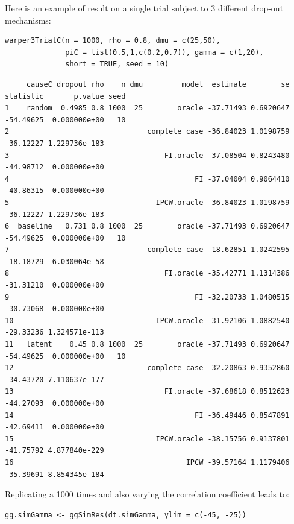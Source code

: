 \documentclass[12pt]{article}
\begin{document}
Here is an example of result on a single trial subject to 3 different
drop-out mechanisms:
\lstset{language=r,label= ,caption= ,captionpos=b,numbers=none}
\begin{lstlisting}
warper3TrialC(n = 1000, rho = 0.8, dmu = c(25,50),
              piC = list(0.5,1,c(0.2,0.7)), gamma = c(1,20),
              short = TRUE, seed = 10)
\end{lstlisting}

\begin{verbatim}
     causeC dropout rho    n dmu         model  estimate        se statistic       p.value seed
1    random  0.4985 0.8 1000  25        oracle -37.71493 0.6920647 -54.49625  0.000000e+00   10
2                                complete case -36.84023 1.0198759 -36.12227 1.229736e-183     
3                                    FI.oracle -37.08504 0.8243480 -44.98712  0.000000e+00     
4                                           FI -37.04004 0.9064410 -40.86315  0.000000e+00     
5                                  IPCW.oracle -36.84023 1.0198759 -36.12227 1.229736e-183     
6  baseline   0.731 0.8 1000  25        oracle -37.71493 0.6920647 -54.49625  0.000000e+00   10
7                                complete case -18.62851 1.0242595 -18.18729  6.030064e-58     
8                                    FI.oracle -35.42771 1.1314386 -31.31210  0.000000e+00     
9                                           FI -32.20733 1.0480515 -30.73068  0.000000e+00     
10                                 IPCW.oracle -31.92106 1.0882540 -29.33236 1.324571e-113     
11   latent    0.45 0.8 1000  25        oracle -37.71493 0.6920647 -54.49625  0.000000e+00   10
12                               complete case -32.20863 0.9352860 -34.43720 7.110637e-177     
13                                   FI.oracle -37.68618 0.8512623 -44.27093  0.000000e+00     
14                                          FI -36.49446 0.8547891 -42.69411  0.000000e+00     
15                                 IPCW.oracle -38.15756 0.9137801 -41.75792 4.877840e-229     
16                                        IPCW -39.57164 1.1179406 -35.39691 8.854345e-184
\end{verbatim}

Replicating a 1000 times and also varying the correlation coefficient leads to:
\lstset{language=r,label= ,caption= ,captionpos=b,numbers=none}
\begin{lstlisting}
gg.simGamma <- ggSimRes(dt.simGamma, ylim = c(-45, -25))
\end{lstlisting}
\end{document}
